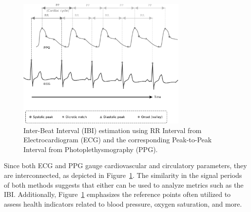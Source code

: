 \begin{figure}[h!]
    \centering
    \includegraphics[width=0.75\textwidth]{img/ecg_ppg_signals.pdf}
    \caption{Inter-Beat Interval (IBI) estimation using RR Interval from Electrocardiogram (ECG) and the corresponding Peak-to-Peak Interval from Photoplethysmography (PPG).}
    \label{fig:ecg_and_ppg}
\end{figure}


Since both \gls{ECG} and \gls{PPG} gauge cardiovascular and circulatory parameters, they are interconnected, as depicted in Figure~\ref{fig:ecg_and_ppg}. The similarity in the signal periods of both methods suggests that either can be used to analyze metrics such as the \gls{IBI}. Additionally, Figure~\ref{fig:ecg_and_ppg} emphasizes the reference points often utilized to assess health indicators related to blood pressure, oxygen saturation, and more.


